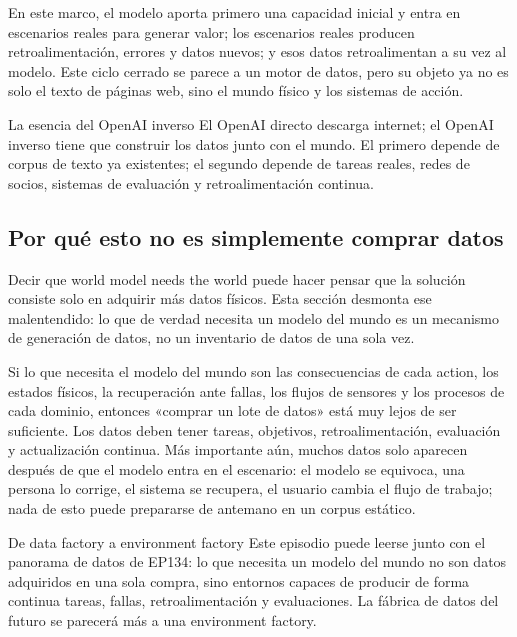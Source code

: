 \documentclass[a4paper]{article}
\begin{document}
En este marco, el modelo aporta primero una capacidad inicial y entra en escenarios reales para generar valor; los escenarios reales producen retroalimentación, errores y datos nuevos; y esos datos retroalimentan a su vez al modelo. Este ciclo cerrado se parece a un motor de datos, pero su objeto ya no es solo el texto de páginas web, sino el mundo físico y los sistemas de acción.

\begin{importantbox}{La esencia del OpenAI inverso}
El OpenAI directo descarga internet; el OpenAI inverso tiene que construir los datos junto con el mundo. El primero depende de corpus de texto ya existentes; el segundo depende de tareas reales, redes de socios, sistemas de evaluación y retroalimentación continua.
\end{importantbox}

\subsection{Por qué esto no es simplemente comprar datos}

Decir que world model needs the world puede hacer pensar que la solución consiste solo en adquirir más datos físicos. Esta sección desmonta ese malentendido: lo que de verdad necesita un modelo del mundo es un mecanismo de generación de datos, no un inventario de datos de una sola vez.

Si lo que necesita el modelo del mundo son las consecuencias de cada action, los estados físicos, la recuperación ante fallas, los flujos de sensores y los procesos de cada dominio, entonces «comprar un lote de datos» está muy lejos de ser suficiente. Los datos deben tener tareas, objetivos, retroalimentación, evaluación y actualización continua. Más importante aún, muchos datos solo aparecen después de que el modelo entra en el escenario: el modelo se equivoca, una persona lo corrige, el sistema se recupera, el usuario cambia el flujo de trabajo; nada de esto puede prepararse de antemano en un corpus estático.

\begin{knowledgebox}{De data factory a environment factory}
Este episodio puede leerse junto con el panorama de datos de EP134: lo que necesita un modelo del mundo no son datos adquiridos en una sola compra, sino entornos capaces de producir de forma continua tareas, fallas, retroalimentación y evaluaciones. La fábrica de datos del futuro se parecerá más a una environment factory.
\end{knowledgebox}
\end{document}
